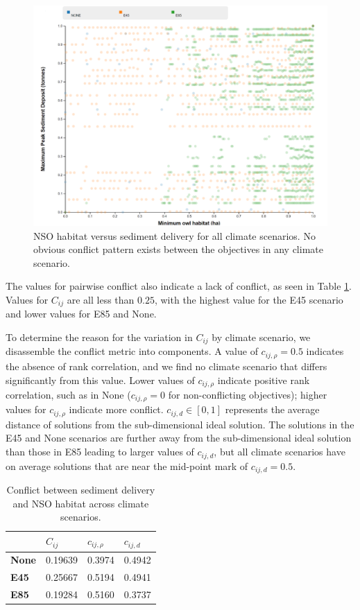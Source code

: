 \begin{figure}[ht]
\centering
\includegraphics[width=.75\textwidth]{../images/2DSlice_NSO_Sed}
\caption[NSO habitat vs. sediment delivery for all climate scenarios]{NSO habitat versus sediment delivery for all climate scenarios. No obvious conflict pattern exists between the objectives in any climate scenario.}
\label{fig:pairplotNSOSed}
\end{figure}

The values for pairwise conflict also indicate a lack of conflict, as seen in Table \ref{tab:pairConflict-SedNSO}. Values for $C_{ij}$ are all less than $0.25$, with the highest value for the E45 scenario and lower values for E85 and None.

To determine the reason for the variation in $C_{ij}$ by climate scenario, we disassemble the conflict metric into components. A value of $c_{ij,\rho} = 0.5$ indicates the absence of rank correlation, and we find no climate scenario that differs significantly from this value. Lower values of $c_{ij,\rho}$ indicate positive rank correlation, such as in None ($c_{ij,\rho}=0$ for non-conflicting objectives); higher values for $c_{ij,\rho}$ indicate more conflict. $c_{ij,d} \in [0,1]$ represents the average distance of solutions from the sub-dimensional ideal solution. The solutions in the E45 and None scenarios are further away from the sub-dimensional ideal solution than those in E85 leading to larger values of $c_{ij,d}$, but all climate scenarios have on average solutions that are near the mid-point mark of $c_{ij,d} = 0.5$.

\begin{table}[]
\centering
\caption[Sediment-NSO conflict across climate scenarios]{Conflict between sediment delivery and NSO habitat across climate scenarios.}
\label{tab:pairConflict-SedNSO}
\begin{tabular}{l|l|ll}
\textbf{}     & \textbf{$C_{ij}$} & \textbf{$c_{ij,\rho}$} & \textbf{$c_{ij,d}$} \\ \hline
\textbf{None} & 0.19639           & 0.3974                 & 0.4942              \\
\textbf{E45}  & 0.25667           & 0.5194                 & 0.4941              \\
\textbf{E85}  & 0.19284           & 0.5160                 & 0.3737             
\end{tabular}
\end{table}

